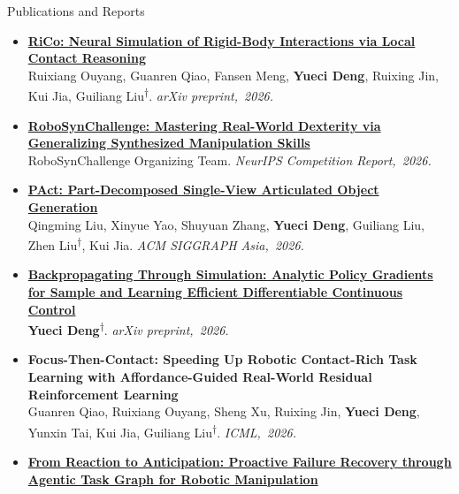 \begin{rSection}{Publications and Reports}
{\fontsize{9.5}{11.8}\selectfont
\begin{itemize}[leftmargin=1.8em,labelsep=0.5em,itemsep=5pt,topsep=1pt,parsep=0pt]
\item[{\scriptsize\color{cvMuted}12.}] \href{https://arxiv.org/abs/2610.12333}{\textbf{RiCo: Neural Simulation of Rigid-Body Interactions via Local Contact Reasoning}}\\[-1pt]
{\color{cvMuted}Ruixiang Ouyang, Guanren Qiao, Fansen Meng, \textbf{Yueci Deng}, Ruixing Jin, Kui Jia, Guiliang Liu\textsuperscript{$\dagger$}.} \textit{arXiv preprint,~2026.}
\item[{\scriptsize\color{cvMuted}11.}] \href{https://robosyn-bench.net/material/RoboSynChallenge-report.pdf}{\textbf{RoboSynChallenge: Mastering Real-World Dexterity via Generalizing Synthesized Manipulation Skills}}\\[-1pt]
{\color{cvMuted}RoboSynChallenge Organizing Team.} \textit{NeurIPS Competition Report,~2026.}
\item[{\scriptsize\color{cvMuted}10.}] \href{https://arxiv.org/abs/2602.14965}{\textbf{PAct: Part-Decomposed Single-View Articulated Object Generation}}\\[-1pt]
{\color{cvMuted}Qingming Liu, Xinyue Yao, Shuyuan Zhang, \textbf{Yueci Deng}, Guiliang Liu, Zhen Liu\textsuperscript{$\dagger$}, Kui Jia.} \textit{ACM SIGGRAPH Asia,~2026.}
\item[{\scriptsize\color{cvMuted}9.}] \href{https://arxiv.org/pdf/2606.21525}{\textbf{Backpropagating Through Simulation: Analytic Policy Gradients for Sample and Learning Efficient Differentiable Continuous Control}}\\[-1pt]
{\color{cvMuted}\textbf{Yueci Deng}\textsuperscript{$\dagger$}.} \textit{arXiv preprint,~2026.}
\item[{\scriptsize\color{cvMuted}8.}] \textbf{Focus-Then-Contact: Speeding Up Robotic Contact-Rich Task Learning with Affordance-Guided Real-World Residual Reinforcement Learning}\\[-1pt]
{\color{cvMuted}Guanren Qiao, Ruixiang Ouyang, Sheng Xu, Ruixing Jin, \textbf{Yueci Deng}, Yunxin Tai, Kui Jia, Guiliang Liu\textsuperscript{$\dagger$}.} \textit{ICML,~2026.}
\item[{\scriptsize\color{cvMuted}7.}] \href{https://arxiv.org/abs/2605.11951}{\textbf{From Reaction to Anticipation: Proactive Failure Recovery through Agentic Task Graph for Robotic Manipulation}}\\[-1pt]

\end{itemize}}
\end{rSection}
